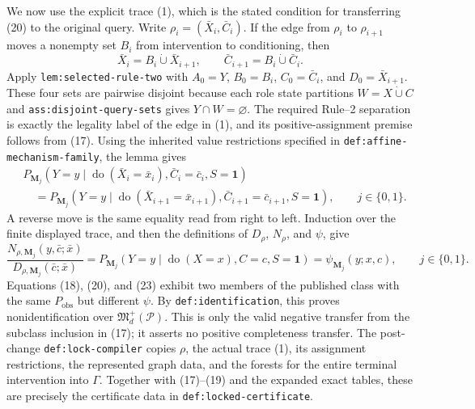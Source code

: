 We now use the explicit trace (1), which is the stated condition for transferring (20) to the original query.  Write \(\rho_i=(\bar X_i,\bar C_i)\).  If the edge from \(\rho_i\) to \(\rho_{i+1}\) moves a nonempty set \(B_i\) from intervention to conditioning, then
\[
 \bar X_i=B_i\mathbin{\dot\cup}\bar X_{i+1},
 \qquad
 \bar C_{i+1}=B_i\mathbin{\dot\cup}\bar C_i.                \tag{21}
\]
Apply \texttt{lem:selected-rule-two} with \(A_0=Y\), \(B_0=B_i\), \(C_0=\bar C_i\), and \(D_0=\bar X_{i+1}\).  These four sets are pairwise disjoint because each role state partitions \(W=X\mathbin{\dot\cup}C\) and \texttt{ass:disjoint-query-sets} gives \(Y\cap W=\varnothing\).  The required Rule--2 separation is exactly the legality label of the edge in (1), and its positive-assignment premise follows from (17).  Using the inherited value restrictions specified in \texttt{def:affine-mechanism-family}, the lemma gives
\[
 \begin{aligned}
 &P_{\mathbf M_j}\!\left(Y=y\mid
       \operatorname{do}(\bar X_i=\bar x_i),
       \bar C_i=\bar c_i,S=\mathbf1\right)\\
 &\quad=P_{\mathbf M_j}\!\left(Y=y\mid
       \operatorname{do}(\bar X_{i+1}=\bar x_{i+1}),
       \bar C_{i+1}=\bar c_{i+1},S=\mathbf1\right),
 \qquad j\in\{0,1\}.                                         \tag{22}
 \end{aligned}
\]
A reverse move is the same equality read from right to left.  Induction over the finite displayed trace, and then the definitions of \(D_\rho\), \(N_\rho\), and \(\psi\), give
\[
 \frac{N_{\rho,\mathbf M_j}(y,\bar c;\bar x)}
      {D_{\rho,\mathbf M_j}(\bar c;\bar x)}
 =P_{\mathbf M_j}(Y=y\mid\operatorname{do}(X=x),C=c,S=\mathbf1)
 =\psi_{\mathbf M_j}(y;x,c),
 \qquad j\in\{0,1\}.                                         \tag{23}
\]
Equations (18), (20), and (23) exhibit two members of the published class with the same \(P_{\mathrm{obs}}\) but different \(\psi\).  By \texttt{def:identification}, this proves nonidentification over \(\mathfrak M_d^+(\mathcal P)\).  This is only the valid negative transfer from the subclass inclusion in (17); it asserts no positive completeness transfer.  The post-change \texttt{def:lock-compiler} copies \(\rho\), the actual trace (1), its assignment restrictions, the represented graph data, and the forests for the entire terminal intervention into \(\Gamma\).  Together with (17)--(19) and the expanded exact tables, these are precisely the certificate data in \texttt{def:locked-certificate}.

